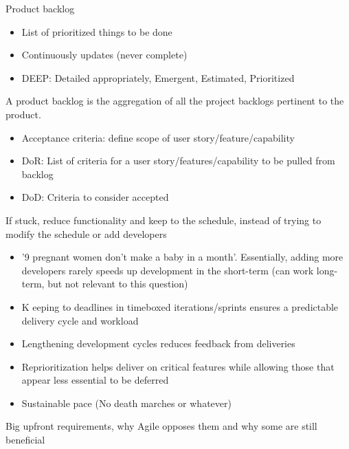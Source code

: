 \documentclass[10pt]{article}
\begin{document}
Product backlog
\begin{itemize}
\item List of prioritized things to be done
\item Continuously updates (never complete)
\item DEEP: Detailed appropriately, Emergent, Estimated, Prioritized
\end{itemize}
A product backlog is the aggregation of all the project backlogs pertinent to the product.
\begin{itemize}
\item Acceptance criteria: define scope of user story/feature/capability
\item DoR: List of criteria for a user story/features/capability to be pulled from backlog
\item DoD: Criteria to consider accepted
\end{itemize}
If stuck, reduce functionality and keep to the schedule, instead of trying to modify the schedule or add developers
\begin{itemize}
\item '9 pregnant women don't make a baby in a month'. Essentially, adding more developers rarely speeds up development in the short-term (can work long-term, but not relevant to this question)
\item K eeping to deadlines in timeboxed iterations/sprints ensures a predictable delivery cycle and workload
\item Lengthening development cycles reduces feedback from deliveries
\item Reprioritization helps deliver on critical features while allowing those that appear less essential to be deferred
\item Sustainable pace (No death marches or whatever)
\end{itemize}
Big upfront requirements, why Agile opposes them and why some are still beneficial
\end{document}
